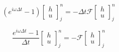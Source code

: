 \documentclass[12pt]{article}
\begin{document}
\[\left(e^{i\omega \Delta t} - 1 \right)\left[\begin{array}{c}
h \\ u
\end{array}\right]^{n}_j   = - \Delta t\boldsymbol{\mathcal{F}}\left[\begin{array}{c}
h \\ u
\end{array}\right]^{n}_j  \]

\[\frac{e^{i\omega \Delta t} - 1}{\Delta t}\left[\begin{array}{c}
h \\ u
\end{array}\right]^{n}_j   = - \boldsymbol{\mathcal{F}}\left[\begin{array}{c}
h \\ u
\end{array}\right]^{n}_j  \]
\end{document}
